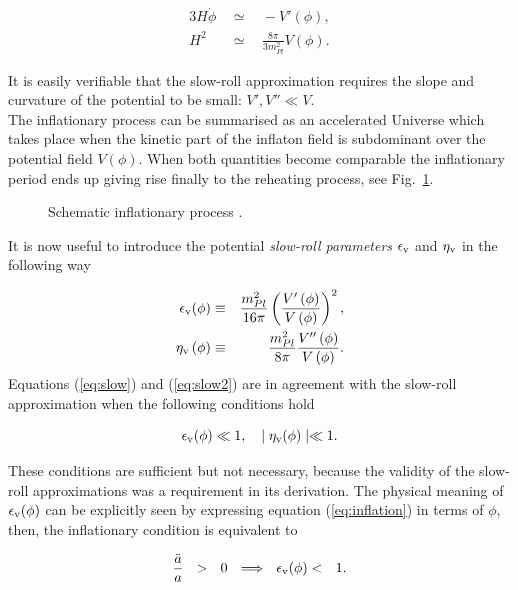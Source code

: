 \documentclass{rmaa}
\def\bea{\begin{eqnarray}}
\def\eea{\end{eqnarray}}
\begin{document}
\bea \label{eq:slow}
3H\dot{\phi} ~~ &\simeq& ~~ -V'(\phi), \\
H^2 ~~ & \simeq& ~~ \frac{8\pi}{3m^2_{Pl}} V(\phi). \label{eq:slow2}
\eea

\noindent
It is easily verifiable that the slow-roll approximation requires the slope 
and curvature of the potential to be small: $V', V'' \ll V$.
\\

The inflationary process can be summarised as an accelerated Universe which takes place when 
the kinetic part of the inflaton field is subdominant over the potential field $V(\phi)$. 
When both quantities become comparable the inflationary period ends up giving 
rise finally to the reheating process, see Fig.~\ref{fig:Field}. 


\begin{figure}[t!] 
\centerline{ \epsfxsize=180pt  }
\caption{Schematic inflationary process \citep{Baumann}.}
\label{fig:Field}
\end{figure}

\vspace{0.5cm}
It is now useful to introduce the potential \textit{slow-roll parameters} 
$\epsilon_{\rm v}$ and $\eta_{\rm v}$ in the following way \citep{Liddle92, Riotto17}


\bea
\epsilon_{\rm v}(\phi) &\equiv&{m^2_{Pl} \over 16 \pi } \left({V'\left(\phi\right) \over V\left(\phi\right)}\right)^2, 
\label{eq:epsi} \\
\eta_{\rm v}\left(\phi\right) &\equiv& \frac{m^2_{Pl}}{8\pi} {V''\left(\phi\right) \over V\left(\phi\right)} \label{eq:eta}.
\eea
%
Equations (\ref{eq:slow}) and (\ref{eq:slow2}) are in agreement with the slow-roll approximation
when the following conditions hold

\begin{equation*}
\epsilon_{\rm v}(\phi) \ll 1,  \,\,\,\,\,\,  \mid \eta_{\rm v}(\phi)\mid \ll 1.
\end{equation*}

\noindent
These conditions are sufficient but not necessary, because the validity of the slow-roll
approximations was a requirement in its derivation.
%
The physical meaning of $\epsilon_{\rm v}(\phi)$ can be explicitly seen by expressing equation (\ref{eq:inflation})
 in terms of $\phi$, then, the inflationary condition is equivalent to
 
 \begin{equation}
 {\ddot a \over a} ~~ > ~~ 0 ~~ \Longrightarrow ~~ \epsilon_{\rm v}(\phi) < ~~  1.
\end{equation}
\end{document}
